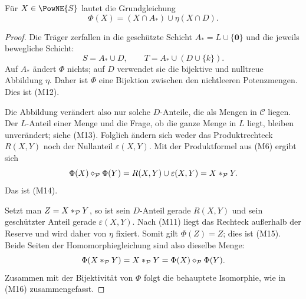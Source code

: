 \documentclass[main.tex]{subfiles}
\begin{document}

Für \(X\in\PowNE{S}\) lautet die Grundgleichung
\[
  \Phi(X)=(X\cap A_*)\cup\eta(X\cap D).
\]

\begin{proof}
Die Träger zerfallen in die geschützte Schicht
\(A_*=L\cup\{\mathbf0\}\) und die jeweils bewegliche Schicht:
\[
  S=A_*\cup D,
  \qquad
  T=A_*\cup(D\cup\{k\}).
\]
Auf \(A_*\) ändert \(\Phi\) nichts; auf \(D\) verwendet sie die bijektive
und nulltreue Abbildung \(\eta\). Daher ist \(\Phi\) eine Bijektion zwischen
den nichtleeren Potenzmengen. Dies ist \textup{(M12)}.

Die Abbildung verändert also nur solche \(D\)-Anteile, die als Mengen in
\(\mathcal C\) liegen. Der \(L\)-Anteil einer Menge und die Frage, ob die
ganze Menge in \(L\) liegt, bleiben unverändert; siehe \textup{(M13)}.
Folglich ändern sich weder das
Produktrechteck \(R(X,Y)\) noch der Nullanteil \(\varepsilon(X,Y)\). Mit der
Produktformel aus \textup{(M6)} ergibt sich
\[
  \Phi(X)\mathbin{\diamond}_{\mathcal P}\Phi(Y)
    =R(X,Y)\cup\varepsilon(X,Y)
    =X\mathbin{\ast}_{\mathcal P}Y.
\]
Das ist \textup{(M14)}.

Setzt man \(Z=X\mathbin{\ast}_{\mathcal P}Y\), so ist sein \(D\)-Anteil gerade
\(R(X,Y)\) und sein geschützter Anteil gerade \(\varepsilon(X,Y)\). Nach
\textup{(M11)} liegt das Rechteck außerhalb der Reserve und wird daher von
\(\eta\) fixiert. Somit gilt \(\Phi(Z)=Z\); dies ist \textup{(M15)}. Beide
Seiten der Homomorphiegleichung sind also dieselbe Menge:
\[
  \Phi(X\mathbin{\ast}_{\mathcal P}Y)
    =X\mathbin{\ast}_{\mathcal P}Y
    =\Phi(X)\mathbin{\diamond}_{\mathcal P}\Phi(Y).
\]
Zusammen mit der Bijektivität von \(\Phi\) folgt die behauptete Isomorphie,
wie in \textup{(M16)} zusammengefasst.
\end{proof}
\end{document}

